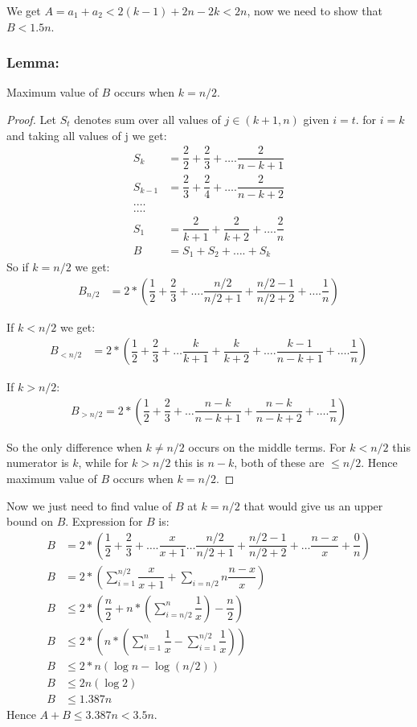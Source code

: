 \documentclass[a4paper]{article}
\begin{document}
We get $A = a_1 + a_2 < 2(k  - 1) + 2n - 2k < 2n$, now we need to show that $B < 1.5n$. 

\subsubsection*{Lemma:}
Maximum value of $B$ occurs when $k = n/2$.
\begin{proof}
Let $S_t$ denotes sum over all values of $j \in (k+1,n)$ given $i = t$.
for $i = k$ and taking all values of j we get: 
\begin{align*}
S_k & = \dfrac{2}{2} + \dfrac{2}{3} + \ldots. \dfrac{2}{n-k+1} \\
S_{k-1} & =  \dfrac{2}{3} + \dfrac{2}{4} + \ldots. \dfrac{2}{n - k + 2} \\
.\ldots\\
\ldots.\\
S_1 & = \dfrac{2}{k+1} + \dfrac{2}{k+2} + \ldots. \dfrac{2}{n} \\
B & = S_1 + S_2 + \ldots. + S_k
\end{align*}
So if $k = n/2$ we get:
\begin{align*}
B_{n/2} & = 2 * (\dfrac{1}{2} + \dfrac{2}{3} + \ldots.\dfrac{n/2}{n/2+1} + \dfrac{n/2-1}{n/2+2} + \ldots.\dfrac{1}{n})
\end{align*}

If $k < n/2$ we get:
\begin{align*}
B_{<n/2} & = 2* (\dfrac{1}{2} + \dfrac{2}{3} + \ldots \dfrac{k}{k+1} + \dfrac{k}{k+2} +\ldots. \dfrac{k-1}{n-k+1}+ \ldots.\dfrac{1}{n})
\end{align*}

If $k > n/2$:
\begin{align*}
B_{>n/2} = 2* (\dfrac{1}{2} + \dfrac{2}{3} + \ldots \dfrac{n - k}{n - k + 1} + \dfrac{n - k}{n - k + 2} + \ldots.\dfrac{1}{n})
\end{align*}

So the only difference when $k \ne n/2$ occurs on the middle terms. For $k < n/2$ this numerator is $k$, while for $k > n/2$ this is $n - k$, both of these are $\le n/2$. Hence maximum value of $B$ occurs when $k = n/2$.
\end{proof}

\pagebreak

Now we just need to find value of $B$ at $k=n/2$ that would give us an upper bound on $B$. Expression for $B$ is:
\begin{align*}
B & =  2 * (\dfrac{1}{2} + \dfrac{2}{3} + \ldots.\dfrac{x}{x+1}\ldots\dfrac{n/2}{n/2+1} + \dfrac{n/2-1}{n/2+2} + \ldots\dfrac{n - x}{x} + \dfrac{0}{n}) \\
B & = 2*(\sum_{i=1}^{n/2} \dfrac{x}{x+1} + \sum_{i=n/2}{n} \dfrac{n-x}{x}) \\
B & \leq 2*(\dfrac{n}{2} + n*(\sum_{i=n/2}^{n} \dfrac{1}{x}) - \dfrac{n}{2}) \\
B & \leq 2*(n*(\sum_{i=1}^{n} \dfrac{1}{x} - \sum_{i=1}^{n/2} \dfrac{1}{x})) \\
B & \leq 2*n(\log n - \log (n/2)) \\
B & \leq 2n(\log 2) \\
B & \leq 1.387n
\end{align*}
Hence $A + B \leq 3.387n < 3.5n$.
\end{document}
